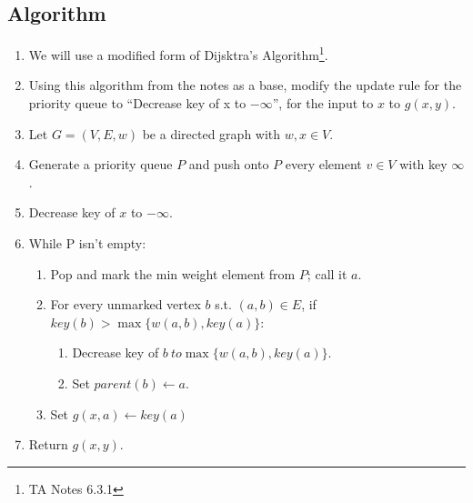 \documentclass{article}
\begin{document}
\subsection{Algorithm}
\begin{enumerate}
      \item We will use a modified form of Dijsktra's Algorithm\footnote{TA Notes 6.3.1}.
      \item Using this algorithm from the notes as a base, modify the update rule for the priority queue
            to ``Decrease key of x to \(- \infty \)'', for the input to \(x\) to \(g(x, y)\).
      \item Let \(G = (V, E, w)\) be a directed graph with \(w, x \in V\).
      \item Generate a priority queue \(P\) and push onto \(P\) every element \(v \in V\) with key
            \(\infty \).
      \item Decrease key of \(x\) to \(- \infty \).
      \item While P isn't empty: \begin{enumerate}
                  \item Pop and mark the min weight element from \(P\); call it \(a\).
                  \item For every unmarked vertex \(b\) s.t. \( (a,b) \in E\), if
                        \(key(b) > \max \{ w(a,b), key(a) \} \): \begin{enumerate}
                              \item Decrease key of \(b\ to \max \{ w(a,b), key(a) \} \).
                              \item Set \(parent(b) \leftarrow a\).
                        \end{enumerate}
                  \item Set \(g(x, a) \leftarrow key(a)\)
            \end{enumerate}
      \item Return \(g(x,y)\).
\end{enumerate}
\end{document}
